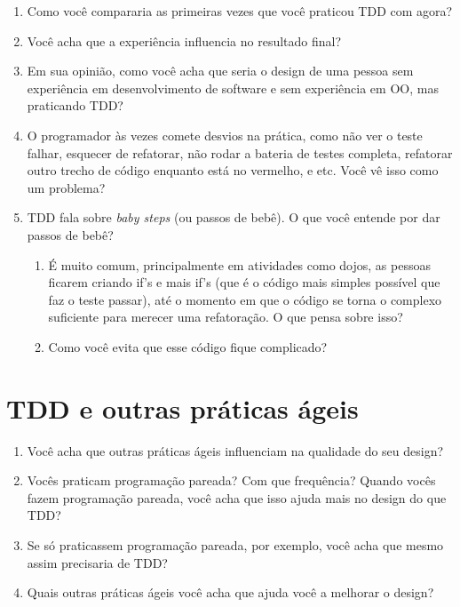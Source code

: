 \begin{enumerate}
	\item Como você compararia as primeiras vezes que você praticou TDD com agora?

	\item Você acha que a experiência influencia no resultado final?

	\item Em sua opinião, como você acha que seria o design de uma pessoa sem
	experiência em desenvolvimento de software e sem experiência em OO, mas praticando TDD?

	\item O programador às vezes comete desvios na prática, como não ver o teste
	falhar,  esquecer de refatorar, não rodar a bateria de testes completa,
	refatorar outro trecho de código enquanto está no vermelho, e etc. Você vê isso
	como um problema?
	
	\item TDD fala sobre \textit{baby steps} (ou passos de bebê). O que você 
	entende por dar passos de bebê?
	\begin{enumerate}
		\item É muito comum, principalmente em atividades como dojos, as pessoas
		ficarem  criando if's e mais if's (que é o código mais simples possível que
		faz o teste passar),  até o momento em que o código se torna o complexo
		suficiente para merecer uma refatoração. O que pensa sobre isso?

		\item Como você evita que esse código fique complicado?
	\end{enumerate}
\end{enumerate}

\section{TDD e outras práticas ágeis}

\begin{enumerate}
	\item Você acha que outras práticas ágeis influenciam na qualidade do seu design?

	\item Vocês praticam programação pareada? Com que frequência? Quando vocês
	fazem programação pareada, você acha que isso ajuda mais no design do que TDD?

	\item Se só praticassem programação pareada, por exemplo, você acha que mesmo
	assim precisaria de TDD?

	\item Quais outras práticas ágeis você acha que ajuda você a melhorar o design?
\end{enumerate}

